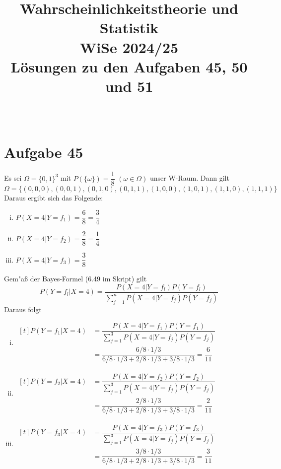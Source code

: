 \documentclass[10pt, oneside]{article}
\title{Wahrscheinlichkeitstheorie und Statistik\\[10pt]\Large{WiSe 2024/25}\\[15pt]\Large{L{\"o}sungen zu den Aufgaben 45, 50 und 51}}
\author{\ }
\date{}
\begin{document}
\maketitle
\vspace{25px}

\section{Aufgabe 45}

Es sei $\Omega = \{0, 1\}^3$ mit $P(\{\omega\}) = \dfrac{1}{8}$ $(\omega \in \Omega)$ unser W-Raum. Dann gilt
\begin{equation*}
    \Omega = \{(0, 0, 0), (0, 0, 1), (0, 1, 0), (0, 1, 1), (1, 0, 0), (1, 0, 1), (1, 1, 0), (1, 1, 1)\}
\end{equation*}
Daraus ergibt sich das Folgende:
\begin{enumerate}[i)]
    \item $P(X = 4 | Y = f_1) = \dfrac{6}{8} = \dfrac{3}{4}$
    \item $P(X = 4 | Y = f_2) = \dfrac{2}{8} = \dfrac{1}{4}$
    \item $P(X = 4 | Y = f_3) = \dfrac{3}{8}$
\end{enumerate}
Gem"a{\ss} der Bayes-Formel (6.49 im Skript) gilt
\begin{equation*}
    P(Y = f_l | X = 4) = \dfrac{P(X = 4 | Y = f_l)P(Y = f_l)}{\sum_{j = 1}^nP(X = 4 | Y = f_j)P(Y = f_j)}
\end{equation*}
Daraus folgt
\begin{enumerate}[i)]
    \item $\begin{aligned}[t]
            P(Y = f_1 | X = 4) &= \dfrac{P(X = 4 | Y = f_1)P(Y = f_1)}{\sum_{j = 1}^3P(X = 4 | Y = f_j)P(Y = f_j)}  \\[5pt]
                               &= \dfrac{6/8 \cdot 1/3}{6/8 \cdot 1/3 + 2/8 \cdot 1/3 + 3/8 \cdot 1/3} = \dfrac{6}{11}
        \end{aligned}$ \\[5pt]
    \item $\begin{aligned}[t]
            P(Y = f_2 | X = 4) &= \dfrac{P(X = 4 | Y = f_2)P(Y = f_2)}{\sum_{j = 1}^3P(X = 4 | Y = f_j)P(Y = f_j)}  \\[5pt]
                               &= \dfrac{2/8 \cdot 1/3}{6/8 \cdot 1/3 + 2/8 \cdot 1/3 + 3/8 \cdot 1/3} = \dfrac{2}{11}
        \end{aligned}$ \\[5pt]
    \item $\begin{aligned}[t]
            P(Y = f_3 | X = 4) &= \dfrac{P(X = 4 | Y = f_3)P(Y = f_3)}{\sum_{j = 1}^3P(X = 4 | Y = f_j)P(Y = f_j)}  \\[5pt]
                               &= \dfrac{3/8 \cdot 1/3}{6/8 \cdot 1/3 + 2/8 \cdot 1/3 + 3/8 \cdot 1/3} = \dfrac{3}{11}
        \end{aligned}$
\end{enumerate}
\end{document}
